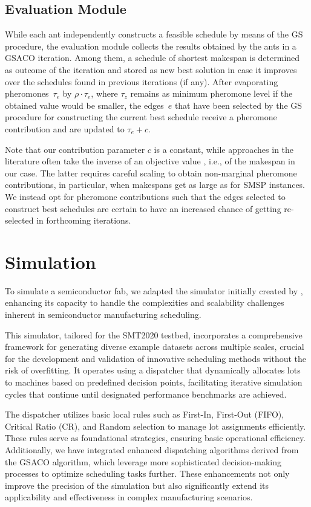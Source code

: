 \documentclass[runningheads]{llncs}
\begin{document}
\subsection{Evaluation Module}
While each ant independently constructs a feasible schedule by means of the
GS procedure, the evaluation module collects the results obtained
by the ants in a GSACO iteration.
Among them, a schedule of shortest makespan is determined as outcome of the
iteration and stored as new best solution in case it improves over the schedules found in previous iterations (if any).
After evaporating pheromones~$\tau_e$ by $\rho\cdot\tau_e$,
where $\tau_z$ remains as minimum pheromone level if the obtained value
would be smaller,
the edges~$e$ that have been selected by the GS procedure for constructing the current best schedule receive a pheromone contribution and are updated to $\tau_e+c$.

Note that our contribution parameter $c$ is a constant,
while approaches in the literature often take the inverse of an objective value
\cite{turkyilmaz2020research}, i.e., of the makespan in our case.
The latter requires careful scaling to obtain non-marginal
pheromone contributions, in particular, when makespans get as large
as for SMSP instances.
We instead opt for pheromone contributions such that the
edges selected to construct best schedules are certain to have an increased chance
of getting re-selected in forthcoming iterations.

\section{Simulation}
\label{sec:sim}

To simulate a semiconductor fab, we adapted the simulator initially created by \cite{Kovács2022}, enhancing its capacity to handle the complexities and scalability challenges inherent in semiconductor manufacturing scheduling.

This simulator, tailored for the SMT2020 testbed, incorporates a comprehensive framework for generating diverse example datasets across multiple scales, crucial for the development and validation of innovative scheduling methods without the risk of overfitting. It operates using a dispatcher that dynamically allocates lots to machines based on predefined decision points, facilitating iterative simulation cycles that continue until designated performance benchmarks are achieved.

The dispatcher utilizes basic local rules such as First-In, First-Out (FIFO), Critical Ratio (CR), and Random selection to manage lot assignments efficiently. These rules serve as foundational strategies, ensuring basic operational efficiency. Additionally, we have integrated enhanced dispatching algorithms derived from the GSACO algorithm, which leverage more sophisticated decision-making processes to optimize scheduling tasks further. These enhancements not only improve the precision of the simulation but also significantly extend its applicability and effectiveness in complex manufacturing scenarios.
\end{document}
